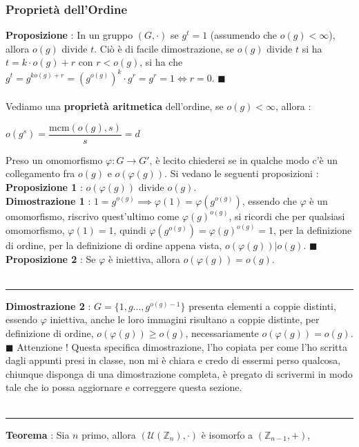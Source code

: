 \documentclass[12pt, letterpaper]{article}
\newcommand{\Z}{{\mathbb Z}}
\newcommand{\mcm}{{\text{mcm}}}
\begin{document}
\subsubsection{Proprietà dell'Ordine}
\textbf{Proposizione }: In un gruppo \((G,\cdot)\) se \(g^t=1\) (assumendo che \(o(g)<\infty\)),
allora \(o(g)\) divide \(t\). Ciò è di facile dimostrazione, 
se \(o(g)\) divide \(t\) si ha \(t=k\cdot o(g)+r\) con \(r<o(g)\), 
si ha che \(g^t=g^{ko(g)+r}=(g^{o(g)})^k\cdot g^r=g^r=1\iff r=0\). \(\blacksquare\)
\\\hphantom{}\\
Vediamo una \textbf{proprietà aritmetica} dell'ordine, se \(o(g)<\infty\), allora :
\begin{center}
    \(o(g^s)=\displaystyle\dfrac{\mcm(o(g),s)}{s}=d\)
\end{center}
Preso un omomorfismo \(\varphi : G\rightarrow G'\), è lecito chiedersi se in qualche 
modo c'è un collegamento fra \(o(g)\) e \(o(\varphi(g))\). Si vedano le seguenti 
proposizioni :\\
\textbf{Proposizione 1} : \(o(\varphi(g))\) divide \(o(g)\).\\
\textbf{Dimostrazione 1} : \(1=g^{o(g)}\implies \varphi(1)=\varphi(g^{o(g)})\), essendo 
che \(\varphi\) è un omomorfismo, riscrivo quest'ultimo come \(\varphi(g)^{o(g)}\), si ricordi 
che per qualsiasi omomorfismo, \(\varphi(1)=1\), quindi \(\varphi(g^{o(g)})=\varphi(g)^{o(g)}=1\),
per la definizione di ordine, per la definizione di ordine appena vista,  \(o(\varphi(g))|o(g)\). \(\blacksquare\)
\\\textbf{Proposizione 2} : Se \(\varphi\) è iniettiva, allora \(o(\varphi(g))=o(g)\).\\
\hphantom{}\\
\color{red}\hrule
\color{red} \textbf{Dimostrazione 2} : \color{black} \(G=\{1,g...,g^{o(g)-1}\}\) presenta elementi a coppie distinti, essendo 
\(\varphi\) iniettiva, anche le loro immagini risultano a coppie distinte, per definizione 
di ordine, \(o(\varphi(g))\ge o(g)\), necessariamente \(o(\varphi(g))=o(g)\). \(\blacksquare\)
\color{red} Attenzione ! Questa specifica dimostrazione, l'ho copiata per come l'ho scritta dagli 
appunti presi in classe, non mi è chiara e credo di essermi perso qualcosa, chiunque disponga di una 
dimostrazione completa, è pregato di scrivermi in modo tale che io possa aggiornare e correggere 
questa sezione.\\\hphantom{}\\
\hrule
\color{black}
\Large\textbf{Teorema } : \normalsize Sia \(n\) primo, allora \((\mathcal{U}(\Z_n),\cdot)\) è isomorfo a \( (\Z_{n-1},+)\),
\end{document}
